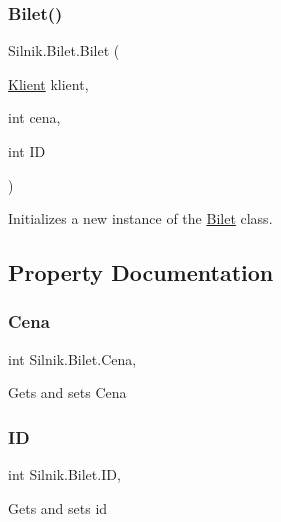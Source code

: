 \subsubsection{\texorpdfstring{Bilet()}{Bilet()}}
{\footnotesize\ttfamily Silnik.\+Bilet.\+Bilet (\begin{DoxyParamCaption}\item[{\mbox{\hyperlink{class_silnik_1_1_klient}{Klient}}}]{klient,  }\item[{int}]{cena,  }\item[{int}]{ID }\end{DoxyParamCaption})}



Initializes a new instance of the \mbox{\hyperlink{class_silnik_1_1_bilet}{Bilet}} class.



\subsection{Property Documentation}
\mbox{\label{class_silnik_1_1_bilet_ac9248d01d2d25b69868d614c3d98b814}} 
\subsubsection{\texorpdfstring{Cena}{Cena}}
{\footnotesize\ttfamily int Silnik.\+Bilet.\+Cena\hspace{0.3cm}{\ttfamily [get]}, {\ttfamily [set]}}



Gets and sets Cena 

\mbox{\label{class_silnik_1_1_bilet_a44f01e9fea5fc9d9942a901df1854f61}} 
\subsubsection{\texorpdfstring{ID}{ID}}
{\footnotesize\ttfamily int Silnik.\+Bilet.\+ID\hspace{0.3cm}{\ttfamily [get]}, {\ttfamily [set]}}



Gets and sets id 

\mbox{\label{class_silnik_1_1_bilet_a04776d4ea2042538d57da9f3d35f3703}} 
